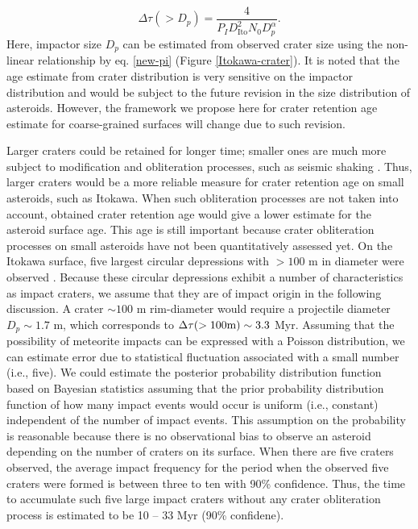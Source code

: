 \documentclass[3p,authoryear]{elsarticle}
\begin{document}
\begin{equation}
	\Delta \tau(>D_p) = \frac{4}{P_ID_\text{Ito}^2N_0 D_p^{\alpha}}.
\end{equation}
Here, impactor size $D_p$ can be estimated from observed crater size using the non-linear relationship by eq. \eqref{new-pi} (Figure \ref{Itokawa-crater}).
It is noted that the age estimate from crater distribution is very sensitive on the impactor distribution and would be subject to the future revision in the size distribution of asteroids. However, the framework we propose here for crater retention age estimate for coarse-grained surfaces will change due to such revision.

Larger craters could be retained for longer time; smaller ones are much more subject to modification and obliteration processes, such as seismic shaking \citep[i.e.,][]{michel2009}.
Thus, larger craters would be a more reliable measure for crater retention age on small asteroids, such as Itokawa.
When such obliteration processes are not taken into account, obtained crater retention age would give a lower estimate for the asteroid surface age.
This age is still important because crater obliteration processes on small asteroids have not been quantitatively assessed yet.
On the Itokawa surface, five largest circular depressions with $>100$ m in diameter were observed \citep{hirata2009}.
Because these circular depressions exhibit a number of characteristics as impact craters, we assume that they are of impact origin in the following discussion.
A crater $\sim 100$ m rim-diameter would require a projectile diameter $D_p\sim 1.7$ m, which corresponds to $\Delta \tau (>100 \rm{m})\sim 3.3$ Myr.
Assuming that the possibility of meteorite impacts can be expressed with a Poisson distribution, we can estimate error due to statistical fluctuation associated with a small number (i.e., five). We could estimate the posterior probability distribution function based on Bayesian statistics assuming that the prior probability distribution function of how many impact events would occur is uniform (i.e., constant) independent of the number of impact events.
This assumption on the probability is reasonable because there is no observational bias to observe an asteroid depending on the number of craters on its surface.
When there are five craters observed, the average impact frequency for the period when the observed five craters were formed is between three to ten with 90\% confidence.
Thus, the time to accumulate such five large impact craters without any crater obliteration process is estimated to be 10 -- 33 Myr (90\% confidene).
\end{document}
